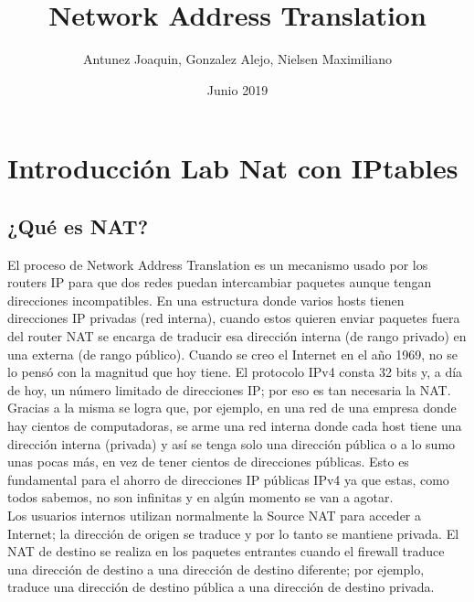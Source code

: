 \documentclass{article}
\title {Network Address Translation}
\author{Antunez Joaquin, Gonzalez Alejo, Nielsen Maximiliano}
\date{Junio 2019}
\begin{document}
 
\begin{titlepage}
\pagestyle{empty}
\maketitle
\thispagestyle{empty}
\end{titlepage}

\section*{Introducción Lab Nat con IPtables}

\subsection*{¿Qué es NAT?}

El proceso de Network Address Translation es un mecanismo usado por los routers IP para que dos redes puedan intercambiar paquetes aunque tengan direcciones incompatibles.
En una estructura donde varios hosts tienen direcciones IP privadas (red interna), cuando estos quieren enviar paquetes fuera del router NAT se encarga de traducir esa dirección interna (de rango privado) en una externa (de rango público).
Cuando se creo el Internet en el año 1969, no se lo pensó con la magnitud que hoy tiene.
El protocolo IPv4 consta 32 bits y, a día de hoy, un número limitado de direcciones IP; por eso es tan necesaria la NAT. Gracias a la misma se logra que, por ejemplo, en una red de una empresa donde hay cientos de computadoras, se arme una red interna donde cada host tiene una dirección interna (privada) y así se tenga solo una dirección pública o a lo sumo unas pocas más, en vez de tener cientos de direcciones públicas. Esto es fundamental para el ahorro de direcciones IP públicas IPv4 ya que estas, como todos sabemos, no son infinitas y en algún momento se van a agotar.\\
Los usuarios internos utilizan normalmente la Source NAT para acceder a Internet; la dirección de origen se traduce y por lo tanto se mantiene privada.
El NAT de destino se realiza en los paquetes entrantes cuando el firewall traduce una dirección de destino a una dirección de destino diferente; por ejemplo, traduce una dirección de destino pública a una dirección de destino privada.
\end{document}
